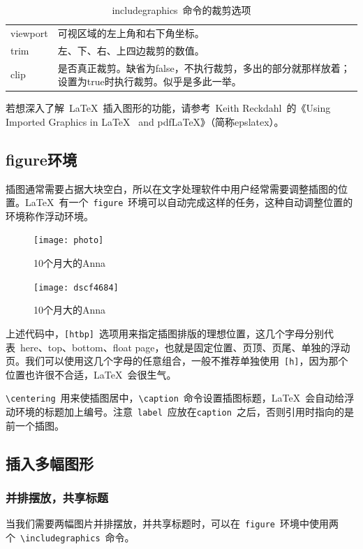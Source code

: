 \begin{table}[htbp]
\caption{includegraphics~命令的裁剪选项}
\label{tab:clip}
\centering
\begin{tabularx}{350pt}{lX}
    \toprule
    viewport & 可视区域的左上角和右下角坐标。\\
    trim & 左、下、右、上四边裁剪的数值。\\
    clip & 是否真正裁剪。缺省为false，不执行裁剪，多出的部分就那样放着；设置为true时执行裁剪。似乎是多此一举。\\
    \bottomrule
\end{tabularx}
\end{table}

若想深入了解~\LaTeX~插入图形的功能，请参考~Keith Reckdahl~的《Using Imported Graphics in \LaTeX~ and pdf\LaTeX》\citep{Reckdahl_2006}（简称epslatex）。

\subsection{figure环境}
插图通常需要占据大块空白，所以在文字处理软件中用户经常需要调整插图的位置。\LaTeX~有一个~\verb|figure|~环境可以自动完成这样的任务，这种自动调整位置的环境称作浮动环境。

\begin{code}
\begin{figure}[htbp]%
\centering
\texttt{[image: photo]}
\caption{10个月大的Anna}
\label{fig:anna}
\end{figure}
\end{code}

\begin{figure}[htbp]
\centering
\texttt{[image: dscf4684]}
\caption{10个月大的Anna}
\label{fig:anna}
\end{figure}

上述代码中，\verb|[htbp]|~选项用来指定插图排版的理想位置，这几个字母分别代表~here、top、bottom、float page，也就是固定位置、页顶、页尾、单独的浮动页。我们可以使用这几个字母的任意组合，一般不推荐单独使用~\verb|[h]|，因为那个位置也许很不合适，\LaTeX~会很生气。

\verb|\centering|~用来使插图居中，\verb|\caption|~命令设置插图标题，\LaTeX~会自动给浮动环境的标题加上编号。注意~\verb|label|~应放在\verb|caption|~之后，否则引用时指向的是前一个插图。

\subsection{插入多幅图形}
\subsubsection{并排摆放，共享标题}
当我们需要两幅图片并排摆放，并共享标题时，可以在~\verb|figure|~环境中使用两个~\verb|\includegraphics|~命令。

